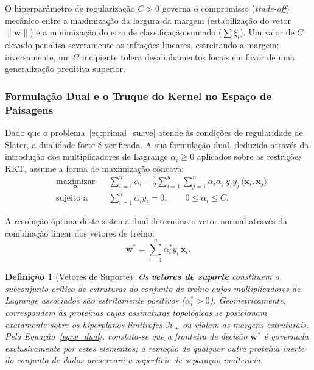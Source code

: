 \documentclass[12pt, a4paper]{article}
\newtheorem{definition}{Definição}
\begin{document}
O hiperparâmetro de regularização $C > 0$ governa o compromisso (\textit{trade-off}) mecânico entre a maximização da largura da margem (estabilização do vetor $\|\mathbf{w}\|$) e a minimização do erro de classificação sumado ($\sum\xi_i$). Um valor de $C$ elevado penaliza severamente as infrações lineares, estreitando a margem; inversamente, um $C$ incipiente tolera desalinhamentos locais em favor de uma generalização preditiva superior.

\subsubsection{Formulação Dual e o Truque do Kernel no Espaço de Paisagens}

Dado que o problema~\eqref{eq:primal_suave} atende às condições de regularidade de Slater, a dualidade forte é verificada. A sua formulação dual, deduzida através da introdução dos multiplicadores de Lagrange $\alpha_i \geq 0$ aplicados sobre as restrições KKT, assume a forma de maximização côncava:
\begin{equation}\label{eq:dual}
\begin{aligned}
    &\underset{\boldsymbol{\alpha}}{\text{maximizar}}    && \sum_{i=1}^n \alpha_i - \frac{1}{2}\sum_{i=1}^n\sum_{j=1}^n \alpha_i\alpha_j\, y_i y_j\, \langle\mathbf{x}_i,\mathbf{x}_j\rangle \\
    &\text{sujeito a}    && \sum_{i=1}^n \alpha_i y_i = 0, \qquad 0 \leq \alpha_i \leq C.
\end{aligned}
\end{equation}

A resolução óptima deste sistema dual determina o vetor normal através da combinação linear dos vetores de treino:
\begin{equation}\label{eq:w_dual}
\mathbf{w}^* = \sum_{i=1}^n \alpha_i^* y_i\, \mathbf{x}_i.
\end{equation}

\begin{definition}[Vetores de Suporte]
Os \textbf{vetores de suporte} constituem o subconjunto crítico de estruturas do conjunto de treino cujos multiplicadores de Lagrange associados são estritamente positivos ($\alpha_i^* > 0$). Geometricamente, correspondem às proteínas cujas assinaturas topológicas se posicionam exatamente sobre os hiperplanos limítrofes $\mathcal{H}_\pm$ ou violam as margens estruturais. Pela Equação~\ref{eq:w_dual}, constata-se que a fronteira de decisão $\mathbf{w}^*$ é governada \emph{exclusivamente} por estes elementos; a remoção de qualquer outra proteína inerte do conjunto de dados preservará a superfície de separação inalterada.
\end{definition}
\end{document}
